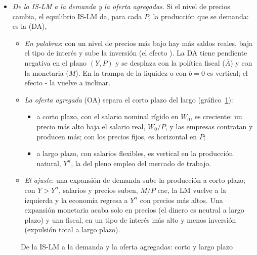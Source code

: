 \documentclass[11pt]{article}
\begin{document}
\begin{itemize}
\item \emph{De la IS-LM a la demanda y la oferta agregadas}. Si el nivel de precios cambia, el equilibrio IS-LM da, para cada $P$, la producción que se demanda: es la  (DA),
  \begin{itemize}
  \item \emph{En palabras}: con un nivel de precios más bajo hay más saldos reales, baja el tipo de interés y sube la inversión (el efecto ). La DA tiene pendiente negativa en el plano $(Y,P)$ y se desplaza con la política fiscal ($\overline{A}$) y con la monetaria ($M$). En la trampa de la liquidez o con $b=0$ es vertical; el efecto - la vuelve a inclinar.
  \item \emph{La oferta agregada} (OA) separa el corto plazo del largo (gráfico~\ref{fig:da-oa}):
    \begin{itemize}
    \item a corto plazo, con el salario nominal rígido en $W_0$, es creciente: un precio más alto baja el salario real, $W_0/P$, y las empresas contratan y producen más\nocite{Modigliani1944Liquidity}; con los precios fijos, es horizontal en $\overline{P}$;
    \item a largo plazo, con salarios flexibles, es vertical en la producción natural, $Y^n$, la del pleno empleo del mercado de trabajo.
    \end{itemize}
  \item \emph{El ajuste}: una expansión de demanda sube la producción a corto plazo; con $Y>Y^n$, salarios y precios suben, $M/P$ cae, la LM vuelve a la izquierda y la economía regresa a $Y^n$ con precios más altos. Una expansión monetaria acaba solo en precios (el dinero es neutral a largo plazo) y una fiscal, en un tipo de interés más alto y menos inversión (expulsión total a largo plazo).
  \end{itemize}
\end{itemize}

\begin{figure}[H]
\centering
\caption{De la IS-LM a la demanda y la oferta agregadas: corto y largo plazo}\label{fig:da-oa}
\end{figure}
\end{document}
